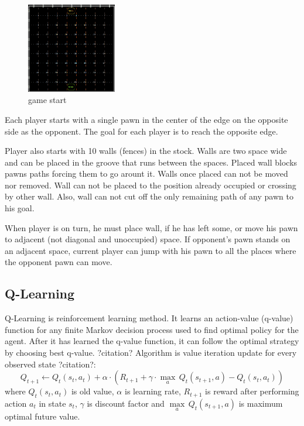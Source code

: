 \documentclass[12pt, oneside]{book}
\begin{document}
    \begin{figure}
      \vspace*{-0.98cm}
      \centering
      \includegraphics[width=0.35\textwidth]{start.png}
      \vspace*{-0.60cm}
      \caption{game start}
      \label{fig:game_start}
      \vspace*{-1.40cm}
    \end{figure}

    Each player starts with a single pawn in the center of the edge on the
    opposite side as the opponent.
    The goal for each player is to reach the opposite edge.

    Player also starts with 10 walls (fences) in the stock.
    Walls are two space wide and can be placed in the groove that runs between
    the spaces.
    Placed wall blocks pawns paths forcing them to go arount it.
    Walls once placed can not be moved nor removed.
    Wall can not be placed to the position already occupied or crossing by
    other wall.
    Also, wall can not cut off the only remaining path of any pawn to his goal.

    When player is on turn, he must place wall, if he has left some, or move
    his pawn to adjacent (not diagonal and unoccupied) space.
    If opponent's pawn stands on an adjacent space, current player can jump
    with his pawn to all the places where the opponent pawn can move.

  \subsection{Q-Learning}
    Q-Learning is reinforcement learning method. It learns an action-value
    (q-value) function for any finite Markov decision process used to find
    optimal policy for the agent. After it has learned the q-value function,
    it can follow the optimal strategy by choosing best q-value. ?citation?
    Algorithm is value iteration update for every observed state ?citation?:
    \begin{equation}
    Q_{t+1} \leftarrow Q_t(s_t, a_t) + \alpha \cdot (
        R_{t+1} + \gamma\cdot {\max_a}\,Q_t(s_{t+1}, a) - Q_t(s_t, a_t)
    )
    \end{equation}
    where $Q_t(s_t, a_t)$ is old value, $\alpha$ is learning rate, $R_{t+1}$ is
    reward after performing action $a_t$ in state $s_t$, $\gamma$ is discount
    factor and $\underset{a}{\max}\,Q_t(s_{t+1}, a)$ is maximum optimal future
    value.
    \newpage
\end{document}
